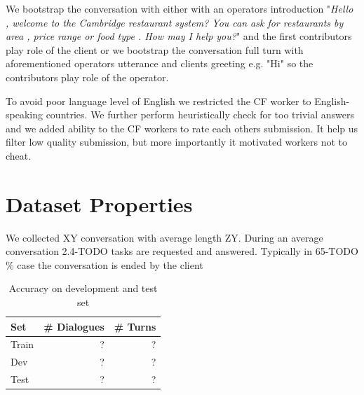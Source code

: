\documentclass[runningheads,a4paper]{llncs}
\begin{document}
We bootstrap the conversation with either with an operators introduction "{\it Hello , welcome to the Cambridge restaurant system? You can ask for restaurants by area , price range or food type . How may I help you?}" and the first contributors play role of the client or we bootstrap the conversation full turn with aforementioned operators utterance and clients greeting e.g. "Hi" so the contributors play role of the operator.

To avoid poor language level of English we restricted the CF worker to English-speaking countries.
We further perform heuristically check for too trivial answers and we added ability to the CF workers to rate each others submission.
It help us filter low quality submission, but more importantly it motivated workers not to cheat. 



\section{Dataset Properties}
\label{sec:props}

We collected XY conversation with average length ZY.
During an average conversation 2.4-TODO tasks are requested and answered.
Typically in 65-TODO \% case the conversation is ended by the client

\begin{table}
\begin{center}
\begin{tabular}{lrr}
\hline
Set   & \# Dialogues & \# Turns \\
\hline
Train  &   ? & ? \\
Dev &   ? & ? \\
Test &   ? & ? \\
\hline
\end{tabular}
\caption{Accuracy on development and test set}
\vspace{-2em}
\end{center}
\label{tab:props}
\end{table}
\end{document}
